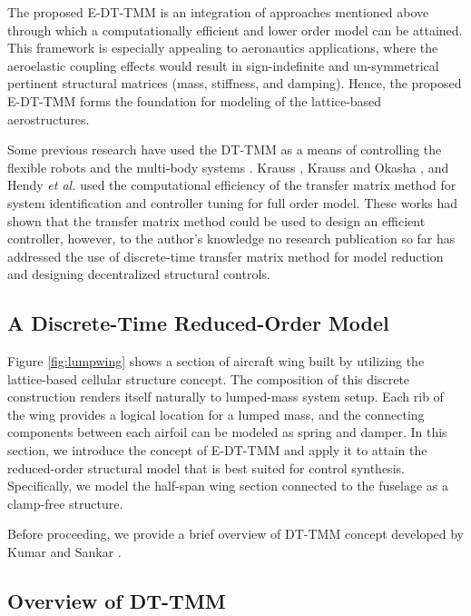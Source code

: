 \documentclass[11pt]{ucthesis}
\begin{document}
The proposed E-DT-TMM is an integration of approaches mentioned above through which a computationally efficient and lower order model can be attained. This framework is especially appealing to aeronautics applications, where the aeroelastic coupling effects would result in sign-indefinite and un-symmetrical pertinent structural matrices (mass, stiffness, and damping). Hence, the proposed E-DT-TMM forms the foundation for modeling of the lattice-based aerostructures.
 
Some previous research have used the DT-TMM as a means of controlling the flexible robots \cite{krauss2013discrete, krauss2011computationally} and the multi-body systems  \cite{rong2010discrete,rui2012discrete,hendy2014controller}. Krauss \cite{krauss2011computationally}, Krauss and Okasha \cite{krauss2013discrete}, and Hendy {\it et al.} \cite{hendy2014controller} used the computational efficiency of the transfer matrix method for system identification and controller tuning for full order model. These works had shown that the transfer matrix method could be used to design an efficient controller, however, to the author's knowledge no research publication so far has addressed the use of discrete-time transfer matrix method for model reduction and designing decentralized structural controls.

\subsection{A Discrete-Time Reduced-Order Model}
\label{sec:DTTMM}

Figure \ref{fig:lumpwing} shows a section of aircraft wing built by utilizing the lattice-based cellular structure concept. The composition of this discrete construction renders itself naturally to lumped-mass system setup. Each rib of the wing provides a logical location for a lumped mass, and the connecting components between each airfoil can be modeled as spring and damper. In this section, we introduce the concept of E-DT-TMM and apply it to attain the reduced-order structural model that is best suited for control synthesis. Specifically, we model the half-span wing section connected to the fuselage as a clamp-free structure. 

Before proceeding, we provide a brief overview of DT-TMM concept developed by Kumar and Sankar \cite{kumar1986new}.   

\subsection{Overview of DT-TMM}
\label{dt-tmm}
\end{document}
